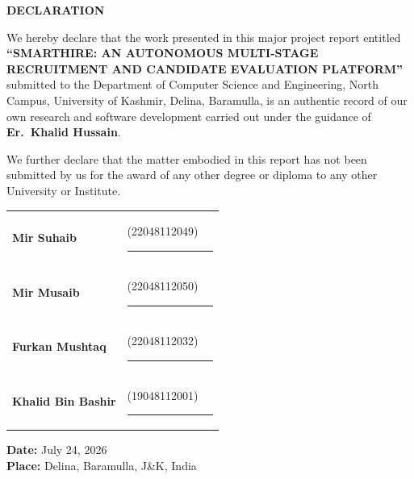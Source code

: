\begin{center}
    {\null \Large \bfseries DECLARATION}\\[0.3in]
\end{center}

We hereby declare that the work presented in this major project report entitled \textbf{``SMARTHIRE: AN AUTONOMOUS MULTI-STAGE RECRUITMENT AND CANDIDATE EVALUATION PLATFORM''} submitted to the Department of Computer Science and Engineering, North Campus, University of Kashmir, Delina, Baramulla, is an authentic record of our own research and software development carried out under the guidance of \textbf{Er.\ Khalid Hussain}.

We further declare that the matter embodied in this report has not been submitted by us for the award of any other degree or diploma to any other University or Institute.

\vspace{1.0in}

\begin{tabular}{p{3.2in}l}
\textbf{Mir Suhaib} & (22048112049) \ \ \rule{1.8in}{0.4pt}\\[0.25in]
\textbf{Mir Musaib} & (22048112050) \ \ \rule{1.8in}{0.4pt}\\[0.25in]
\textbf{Furkan Mushtaq} & (22048112032) \ \ \rule{1.8in}{0.4pt}\\[0.25in]
\textbf{Khalid Bin Bashir} & (19048112001) \ \ \rule{1.8in}{0.4pt}\\
\end{tabular}

\vspace{0.4in}
\textbf{Date:} July 24, 2026\\
\textbf{Place:} Delina, Baramulla, J\&K, India
\cleardoublepage
